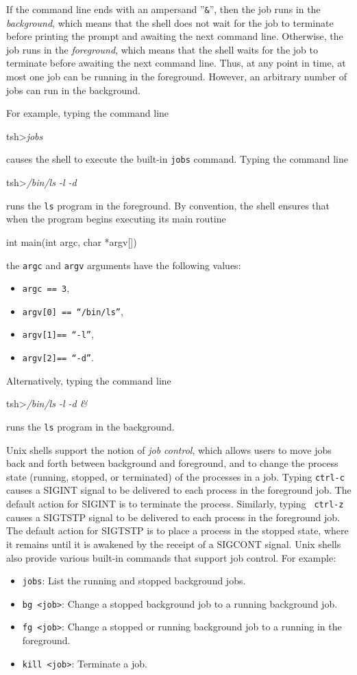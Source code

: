 \documentclass[11pt]{article}
\begin{document}
If the command line ends with an ampersand ''{\tt \&}'', then the job
runs in the {\em background}, which means that the shell does not wait
for the job to terminate before printing the prompt and awaiting the
next command line. Otherwise, the job runs in the {\em foreground},
which means that the shell waits for the job to terminate before
awaiting the next command line. Thus, at any point in time, at most
one job can be running in the foreground. However, an arbitrary number
of jobs can run in the background.

For example, typing the command line 
\begin{tty}
    tsh>{\em jobs}
\end{tty}
causes the shell to execute the built-in {\tt jobs} command. 
Typing the command line
\begin{tty}
    tsh>{\em /bin/ls -l -d}    	
\end{tty}
runs the {\tt ls} program in the foreground.  
By convention, the shell ensures that when the program begins
executing its main routine
\begin{codefrag}
    int main(int argc, char *argv[]) 
\end{codefrag}
the {\tt argc} and {\tt argv} arguments have the following values:
\begin{itemize}
\item {\tt argc == 3},
\item {\tt argv[0] == ``/bin/ls''}, 
\item {\tt argv[1]== ``-l''},
\item {\tt argv[2]== ``-d''}. 
\end{itemize}
Alternatively, typing the command line
\begin{tty}
    tsh>{\em /bin/ls -l -d &}    	
\end{tty}
runs the {\tt ls} program in the background.

Unix shells support the notion of {\em job control}, which allows
users to move jobs back and forth between background and foreground,
and to change the process state (running, stopped, or terminated) of
the processes in a job.  Typing {\tt ctrl-c} causes a SIGINT signal to
be delivered to each process in the foreground job.  The default
action for SIGINT is to terminate the process.  Similarly, typing {\tt
ctrl-z} causes a SIGTSTP signal to be delivered to each process in the
foreground job. The default action for SIGTSTP is to place a process in
the stopped state, where it remains until it is awakened by the receipt
of a SIGCONT signal.  Unix shells also provide various built-in
commands that support job control. For example:
\begin{itemize}
\item {\tt jobs}: List the running and stopped background jobs.
\item {\tt bg <job>}: 
Change a stopped background job to a running background job.
\item {\tt fg <job>}: 
Change a stopped or running background job to a running in the foreground.
\item {\tt kill <job>}: Terminate a job.
\end{itemize}
\end{document}
